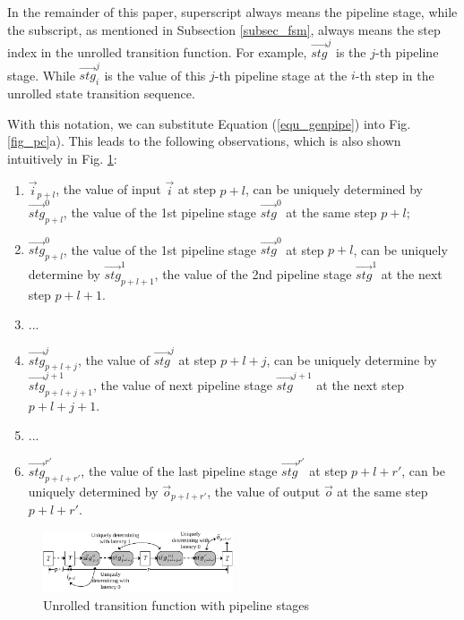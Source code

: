\documentclass[conference]{IEEEtran}
\begin{document}
In the remainder of this paper,
superscript always means the pipeline stage,
while the subscript,
as mentioned in Subsection \ref{subsec_fsm},
always means the step index in the unrolled transition function.
For example,
$\vec{stg}^j$ is the $j$-th pipeline stage.
While $\vec{stg}^j_i$ is the value of this $j$-th pipeline stage 
at the $i$-th step in the unrolled state transition sequence.

With this notation,
we can substitute Equation (\ref{equ_genpipe}) into Fig. \ref{fig_pc}a).
This leads to the following observations,
which is also shown intuitively in Fig. \ref{fig_encexp}:

\begin{enumerate}
\item $\vec{i}_{p+l}$,
the value of input $\vec{i}$ at step $p+l$,
can be uniquely determined by $\vec{stg}^0_{p+l}$,
the value of  the 1st pipeline stage $\vec{stg}^0$ at the same step $p+l$;
 \item $\vec{stg}^0_{p+l}$,
the value of the 1st pipeline stage $\vec{stg}^0$ at step $p+l$,
can be uniquely determine by $\vec{stg}^{1}_{p+l+1}$,
the value of the 2nd pipeline stage $\vec{stg}^{1}$ at the next step $p+l+1$.
 \item ...
 \item $\vec{stg}^{j}_{p+l+j}$,
 the value of $\vec{stg}^{j}$ at step $p+l+j$,
 can be uniquely determine by $\vec{stg}^{j+1}_{p+l+j+1}$,
 the value of next pipeline stage $\vec{stg}^{j+1}$ at the next step $p+l+j+1$.
 \item ...
 \item $\vec{stg}^{r'}_{p+l+r'}$,
 the value of the last pipeline stage $\vec{stg}^{r'}$ at step $p+l+r'$,
 can be uniquely determined by $\vec{o}_{p+l+r'}$,
 the value of output $\vec{o}$ at the same step $p+l+r'$.
\end{enumerate}



\begin{figure}[b]
\begin{center}
\includegraphics[width=0.5\textwidth]{encexp}
\end{center}
\caption{Unrolled transition function with pipeline stages}
  \label{fig_encexp}
\end{figure}
\end{document}
